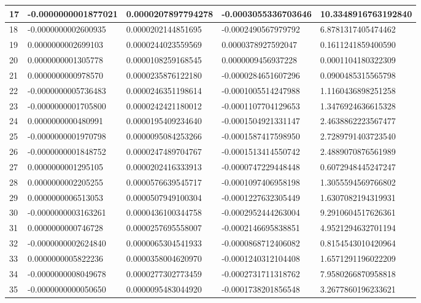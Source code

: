 \begin{center}
\begin{longtable}{|p{0.5cm}|p{3.5cm}|p{3.5cm}|p{3.5cm}|p{3.5cm}|}
\hline
17  & -0.0000000001877021  & 0.0000207897794278  & -0.0003055336703646  & 10.3348916763192840\\
\hline
18  & -0.0000000002600935  & 0.0000202144851695  & -0.0002490567979792  & 6.8781317405474462\\
\hline
19  & 0.0000000002699103  & 0.0000244023559569  & 0.0000378927592047  & 0.1611241859400590\\
\hline
20  & 0.0000000001305778  & 0.0000108259168545  & 0.0000009456937228  & 0.0001104180322309\\
\hline
21  & 0.0000000000978570  & 0.0000235876122180  & -0.0000284651607296  & 0.0900485315565798\\
\hline
22  & -0.0000000005736483  & 0.0000246351198614  & -0.0001005514247988  & 1.1160436898251258\\
\hline
23  & -0.0000000001705800  & 0.0000242421180012  & -0.0001107704129653  & 1.3476924636615328\\
\hline
24  & 0.0000000000480991  & 0.0000195409234640  & -0.0001504921331147  & 2.4638862223567477\\
\hline
25  & -0.0000000001970798  & 0.0000095084253266  & -0.0001587417598950  & 2.7289791403723540\\
\hline
26  & -0.0000000001848752  & 0.0000247489704767  & -0.0001513414550742  & 2.4889070876561989\\
\hline
27  & 0.0000000001295105  & 0.0000202416333913  & -0.0000747229448448  & 0.6072948445247247\\
\hline
28  & 0.0000000002205255  & 0.0000576639545717  & -0.0001097406958198  & 1.3055594569766802\\
\hline
29  & 0.0000000006513053  & 0.0000507949100304  & -0.0001227632305449  & 1.6307082194319931\\
\hline
30  & -0.0000000003163261  & 0.0000436100344758  & -0.0002952444263004  & 9.2910604517626361\\
\hline
31  & 0.0000000000746728  & 0.0000257695558007  & -0.0002146695838851  & 4.9521294632701194\\
\hline
32  & -0.0000000002624840  & 0.0000065304541933  & -0.0000868712406082  & 0.8154543010420964\\
\hline
33  & 0.0000000005822236  & 0.0000358004620970  & -0.0001240312104408  & 1.6571291196022209\\
\hline
34  & -0.0000000008049678  & 0.0000277302773459  & -0.0002731711318762  & 7.9580266870958818\\
\hline
35  & -0.0000000000050650  & 0.0000095483044920  & -0.0001738201856548  & 3.2677860196233621\\

\end{longtable}
\end{center}
